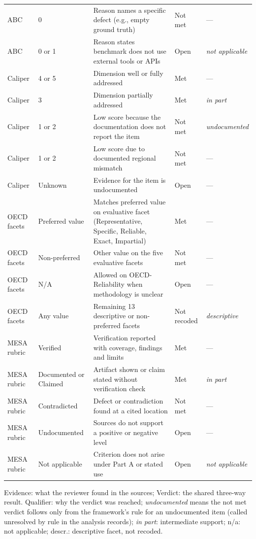 \documentclass[10pt,conference]{IEEEtran}
\begin{document}
\begin{table}[t]
\begin{tabularx}{\textwidth}{@{}llXll@{}}
ABC & 0 & Reason names a specific defect (e.g., empty ground truth) & Not met & --- \\
ABC & 0 or 1 & Reason states benchmark does not use external tools or APIs & Open & \emph{not applicable} \\
\midrule
Caliper & 4 or 5 & Dimension well or fully addressed & Met & --- \\
Caliper & 3 & Dimension partially addressed & Met & \emph{in part} \\
Caliper & 1 or 2 & Low score because the documentation does not report the item & Not met & \emph{undocumented} \\
Caliper & 1 or 2 & Low score due to documented regional mismatch & Not met & --- \\
Caliper & Unknown & Evidence for the item is undocumented & Open & --- \\
\midrule
OECD facets & Preferred value & Matches preferred value on evaluative facet (Representative, Specific, Reliable, Exact, Impartial) & Met & --- \\
OECD facets & Non-preferred & Other value on the five evaluative facets & Not met & --- \\
OECD facets & N/A & Allowed on OECD-Reliability when methodology is unclear & Open & --- \\
OECD facets & Any value & Remaining 13 descriptive or non-preferred facets & Not recoded & \emph{descriptive} \\
\midrule
MESA rubric & Verified & Verification reported with coverage, findings and limits & Met & --- \\
MESA rubric & Documented or Claimed & Artifact shown or claim stated without verification check & Met & \emph{in part} \\
MESA rubric & Contradicted & Defect or contradiction found at a cited location & Not met & --- \\
MESA rubric & Undocumented & Sources do not support a positive or negative level & Open & --- \\
MESA rubric & Not applicable & Criterion does not arise under Part A or stated use & Open & \emph{not applicable} \\
\bottomrule
\end{tabularx}
\par\vspace{2pt}\raggedright\footnotesize Evidence: what the reviewer found in the sources; Verdict: the shared three-way result. Qualifier: why the verdict was reached; \emph{undocumented} means the not met verdict follows only from the framework's rule for an undocumented item (called unresolved by rule in the analysis records); \emph{in part}: intermediate support; n/a: not applicable; descr.: descriptive facet, not recoded.
\end{table}
\end{document}

